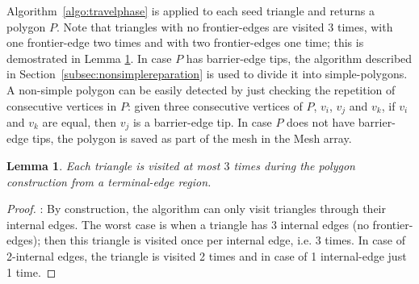 \documentclass[lineno,pdflatex,sn-mathphys]{sn-jnl}%
\theoremstyle{thmstyleone}%
\newtheorem{lemma}{Lemma}%
\theoremstyle{thmstyletwo}%
\theoremstyle{thmstylethree}%
\begin{document}
Algorithm~\ref{algo:travelphase} is applied to each seed triangle and returns a polygon $P$. Note that triangles with no frontier-edges are visited 3 times, with one frontier-edge two times and with two frontier-edges one time; this is demostrated in Lemma \ref{l:lemmatravelphase}. In case $P$ has barrier-edge tips, the algorithm described in Section~\ref{subsec:nonsimplereparation} is used to divide it into simple-polygons. A non-simple polygon can be easily detected by just checking the repetition of consecutive vertices in $P$: given three consecutive vertices of $P$, $v_i$, $v_j$ and $v_k$, if $v_i$ and $v_k$ are equal, then $v_j$ is a barrier-edge tip. In case $P$ does not have barrier-edge tips,  the polygon is saved as part of the mesh in the Mesh array.


\begin{lemma}{Each triangle is visited at most $3$ times during the polygon construction from a terminal-edge region.} \label{l:lemmatravelphase}
\end{lemma}

\begin{proof}: By construction,  the algorithm can only  visit triangles through their internal edges. The worst case  is when a triangle has 3 internal edges (no frontier-edges); then this triangle is visited once per internal edge, i.e. 3 times. In case of 2-internal edges, the triangle is visited 2 times and in case of 1 internal-edge just 1 time.


\end{proof}

\end{document}
